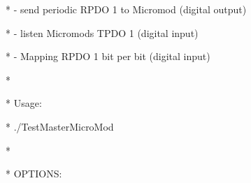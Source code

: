 \documentclass[a4paper,12pt]{book}
\begin{document}
{\ttfamily
* \space {}- send periodic RPDO 1 to Micromod (digital output) \space \space \space \space \space \space *}

{\ttfamily
* \space {}- listen Micromod{\textquotesingle}s TPDO 1 (digital input)
\space \space \space \space \space \space \space \space \space \space \space \space \space \space \space *}

{\ttfamily
* \space {}- Mapping RPDO 1 bit per bit (digital input)
\space \space \space \space \space \space \space \space \space \space \space \space \space *}

{\ttfamily
*
\space \space \space \space \space \space \space \space \space \space \space \space \space \space \space \space \space \space \space \space \space \space \space \space \space \space \space \space \space \space \space \space \space \space \space \space \space \space \space \space \space \space \space \space \space \space \space \space \space \space \space \space \space \space \space \space \space \space \space *}

{\ttfamily
* \space \space Usage:
\space \space \space \space \space \space \space \space \space \space \space \space \space \space \space \space \space \space \space \space \space \space \space \space \space \space \space \space \space \space \space \space \space \space \space \space \space \space \space \space \space \space \space \space \space \space \space \space \space \space *}

{\ttfamily
* \space \space ./TestMasterMicroMod \space [OPTIONS]
\space \space \space \space \space \space \space \space \space \space \space \space \space \space \space \space \space \space \space \space \space \space \space \space \space *}

{\ttfamily
*
\space \space \space \space \space \space \space \space \space \space \space \space \space \space \space \space \space \space \space \space \space \space \space \space \space \space \space \space \space \space \space \space \space \space \space \space \space \space \space \space \space \space \space \space \space \space \space \space \space \space \space \space \space \space \space \space \space \space \space *}

{\ttfamily
* \space \space OPTIONS:
\space \space \space \space \space \space \space \space \space \space \space \space \space \space \space \space \space \space \space \space \space \space \space \space \space \space \space \space \space \space \space \space \space \space \space \space \space \space \space \space \space \space \space \space \space \space \space \space *}
\end{document}
